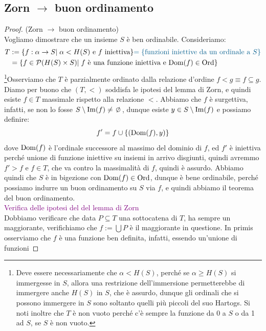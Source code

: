 \subsection{\texorpdfstring{Zorn $\rightarrow$ buon ordinamento}{Zorn implica buon ordinamento}}

\begin{proof}
	(Zorn $\rightarrow$ buon ordinamento)\\
	Vogliamo dimostrare che un insieme $S$ \`e ben ordinabile. Consideriamo:
	\[ \begin{split}
		T &:= \{f : \alpha \to S | \;\text{$\alpha < H(S)$ e $f$ iniettiva}\} \textcolor{MidnightBlue}{=\{\text{funzioni iniettive da un ordinale a $S$}\}} \\
		  &= \{f \in \ps(H(S) \times S) | \; \text{$f$ \`e una funzione iniettiva e $\Dom(f) \in \Ord$}\}
	\end{split}
		\]
	\footnote{Deve essere necessariamente che $\alpha < H(S)$, perch\'e se $\alpha \geq H(S)$ si immergesse in $S$, allora una restrizione dell'immersione permetterebbe di immergere anche $H(S)$ in $S$, che \`e assurdo, dunque 
	gli ordinali che si possono immergere in $S$ sono soltanto quelli pi\`u piccoli del suo Hartogs. Si noti inoltre che $T$ \`e non vuoto perch\'e c'\`e sempre la funzione da 0 a $S$ o da 1 ad $S$, se $S$ \`e non vuoto.}Osserviamo
	che $T$ \`e parzialmente ordinato dalla relazione d'ordine $f < g \equiv f \subseteq g$. Diamo per buono che $(T,<)$ soddisfa le ipotesi del 
	lemma di Zorn, e quindi esiste $f \in T$ massimale rispetto alla relazione $<$. Abbiamo che $f$ \`e surgettiva, infatti, se non lo fosse $S \setminus \Imm(f) \ne \emptyset$, dunque esiste $y \in S \setminus \operatorname{Im}(f)$ e possiamo definire:
	\[ f' = f \cup \{(\operatorname{Dom}(f),y)\}
		\]
	dove $\operatorname{Dom}(f)$ \`e l'ordinale successore al massimo del dominio di $f$, ed $f'$ \`e iniettiva perch\'e unione di funzione iniettive su insiemi in arrivo disgiunti, quindi avremmo $f' > f$ e $f \in T$, che va contro la massimalit\`a di $f$, quindi \`e assurdo.
	Abbiamo quindi che $S$ \`e in bigezione con $\operatorname{Dom}(f) \in \operatorname{Ord}$, dunque \`e bene ordinabile, perch\'e possiamo indurre un buon ordinamento su $S$ via $f$, e quindi abbiamo il teorema del buon ordinamento.\\
	\textcolor{purple}{Verifica delle ipotesi del del lemma di Zorn}\\
	Dobbiamo verificare che data $P \subseteq T$ una sottocatena di $T$, ha sempre un maggiorante, verifichiamo che $f := \bigcup P$ \`e il maggiorante in questione. In primis osserviamo che $f$ \`e una funzione ben definita, infatti, essendo un'unione di funzioni

\end{proof}
